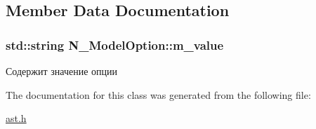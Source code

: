 \subsection{Member Data Documentation}
\hypertarget{classN__ModelOption_ad618798d401e3856f027ba7856359dd7}{}
\subsubsection[{m\+\_\+value}]{\setlength{\rightskip}{0pt plus 5cm}std\+::string N\+\_\+\+Model\+Option\+::m\+\_\+value\hspace{0.3cm}{\ttfamily [protected]}}\label{classN__ModelOption_ad618798d401e3856f027ba7856359dd7}


Содержит значение опции 



The documentation for this class was generated from the following file\+:\begin{DoxyCompactItemize}
\item 
\hyperlink{ast_8h}{ast.\+h}\end{DoxyCompactItemize}
